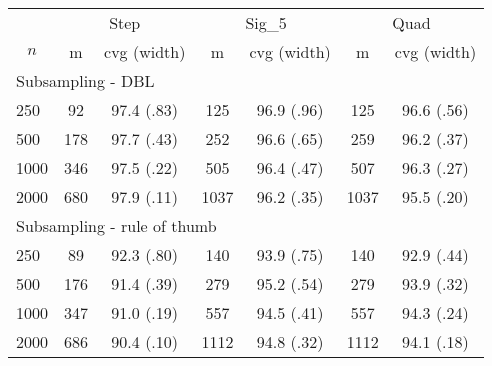 \begin{tabular}{lcccccc}
   \toprule
 
           & \multicolumn{2}{c}{Step}& \multicolumn{2}{c}{Sig\_5}& \multicolumn{2}{c}{Quad} \\ 
             \cmidrule(l{2pt}r{2pt}){2-3} \cmidrule(l{2pt}r{2pt}){4-5} \cmidrule(l{2pt}r{2pt}){6-7} 
             \multicolumn{1}{c}{$n$} & \multicolumn{1}{c}{m}& \multicolumn{1}{c}{cvg (width)}& \multicolumn{1}{c}{m}& \multicolumn{1}{c}{cvg (width)}& \multicolumn{1}{c}{m}& \multicolumn{1}{c}{cvg (width)} \\  
             \hline   
 \multicolumn{7}{l}{Subsampling - DBL} \\ 
250 & 92 & 97.4 (.83) & 125 & 96.9 (.96) & 125 & 96.6 (.56) \\ 
  500 & 178 & 97.7 (.43) & 252 & 96.6 (.65) & 259 & 96.2 (.37) \\ 
  1000 & 346 & 97.5 (.22) & 505 & 96.4 (.47) & 507 & 96.3 (.27) \\ 
  2000 & 680 & 97.9 (.11) & 1037 & 96.2 (.35) & 1037 & 95.5 (.20) \\ 
       \hline   
 \multicolumn{7}{l}{Subsampling - rule of thumb} \\ 
250 & 89 & 92.3 (.80) & 140 & 93.9 (.75) & 140 & 92.9 (.44) \\ 
  500 & 176 & 91.4 (.39) & 279 & 95.2 (.54) & 279 & 93.9 (.32) \\ 
  1000 & 347 & 91.0 (.19) & 557 & 94.5 (.41) & 557 & 94.3 (.24) \\ 
  2000 & 686 & 90.4 (.10) & 1112 & 94.8 (.32) & 1112 & 94.1 (.18) \\ 
   \hline
\end{tabular}
